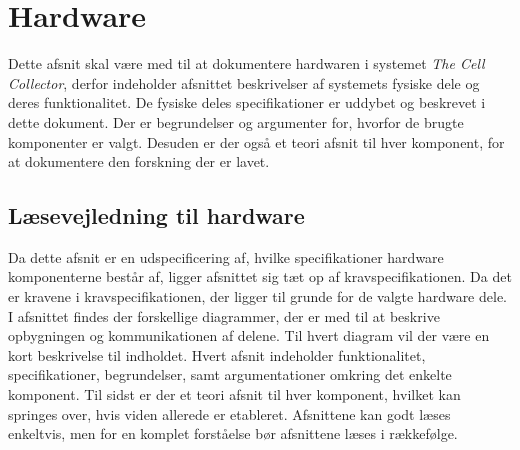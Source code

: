  \section{Hardware}
Dette afsnit skal være med til at dokumentere hardwaren i systemet \textit{The Cell Collector}, derfor indeholder afsnittet beskrivelser af systemets fysiske dele og deres funktionalitet. De fysiske deles specifikationer er uddybet og beskrevet i dette dokument. Der er begrundelser og argumenter for, hvorfor de brugte komponenter er valgt. Desuden er der også et teori afsnit til hver komponent, for at dokumentere den forskning der er lavet.

\subsection{Læsevejledning til hardware}
Da dette afsnit er en udspecificering af, hvilke specifikationer hardware komponenterne består af, ligger afsnittet sig tæt op af kravspecifikationen. Da det er kravene i kravspecifikationen, der ligger til grunde for de valgte hardware dele. I afsnittet findes der forskellige diagrammer, der er med til at beskrive opbygningen og kommunikationen af delene. Til hvert diagram vil der være en kort beskrivelse til indholdet. Hvert afsnit indeholder funktionalitet, specifikationer,  begrundelser, samt argumentationer omkring det enkelte komponent. Til sidst er der et teori afsnit til hver komponent, hvilket kan springes over, hvis viden allerede er etableret. Afsnittene kan godt læses enkeltvis, men for en komplet forståelse bør afsnittene læses i rækkefølge. 

